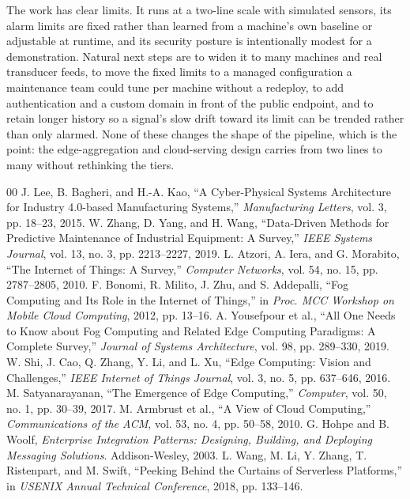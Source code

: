 \documentclass[conference]{IEEEtran}
\begin{document}
The work has clear limits. It runs at a two-line scale with simulated sensors, its alarm limits are fixed rather than learned from a machine's own baseline or adjustable at runtime, and its security posture is intentionally modest for a demonstration. Natural next steps are to widen it to many machines and real transducer feeds, to move the fixed limits to a managed configuration a maintenance team could tune per machine without a redeploy, to add authentication and a custom domain in front of the public endpoint, and to retain longer history so a signal's slow drift toward its limit can be trended rather than only alarmed. None of these changes the shape of the pipeline, which is the point: the edge-aggregation and cloud-serving design carries from two lines to many without rethinking the tiers.

\begin{thebibliography}{00}
 J. Lee, B. Bagheri, and H.-A. Kao, ``A Cyber-Physical Systems Architecture for Industry 4.0-based Manufacturing Systems,'' \emph{Manufacturing Letters}, vol. 3, pp. 18--23, 2015.
 W. Zhang, D. Yang, and H. Wang, ``Data-Driven Methods for Predictive Maintenance of Industrial Equipment: A Survey,'' \emph{IEEE Systems Journal}, vol. 13, no. 3, pp. 2213--2227, 2019.
 L. Atzori, A. Iera, and G. Morabito, ``The Internet of Things: A Survey,'' \emph{Computer Networks}, vol. 54, no. 15, pp. 2787--2805, 2010.
 F. Bonomi, R. Milito, J. Zhu, and S. Addepalli, ``Fog Computing and Its Role in the Internet of Things,'' in \emph{Proc. MCC Workshop on Mobile Cloud Computing}, 2012, pp. 13--16.
 A. Yousefpour et al., ``All One Needs to Know about Fog Computing and Related Edge Computing Paradigms: A Complete Survey,'' \emph{Journal of Systems Architecture}, vol. 98, pp. 289--330, 2019.
 W. Shi, J. Cao, Q. Zhang, Y. Li, and L. Xu, ``Edge Computing: Vision and Challenges,'' \emph{IEEE Internet of Things Journal}, vol. 3, no. 5, pp. 637--646, 2016.
 M. Satyanarayanan, ``The Emergence of Edge Computing,'' \emph{Computer}, vol. 50, no. 1, pp. 30--39, 2017.
 M. Armbrust et al., ``A View of Cloud Computing,'' \emph{Communications of the ACM}, vol. 53, no. 4, pp. 50--58, 2010.
 G. Hohpe and B. Woolf, \emph{Enterprise Integration Patterns: Designing, Building, and Deploying Messaging Solutions}. Addison-Wesley, 2003.
 L. Wang, M. Li, Y. Zhang, T. Ristenpart, and M. Swift, ``Peeking Behind the Curtains of Serverless Platforms,'' in \emph{USENIX Annual Technical Conference}, 2018, pp. 133--146.

\end{thebibliography}
\end{document}
